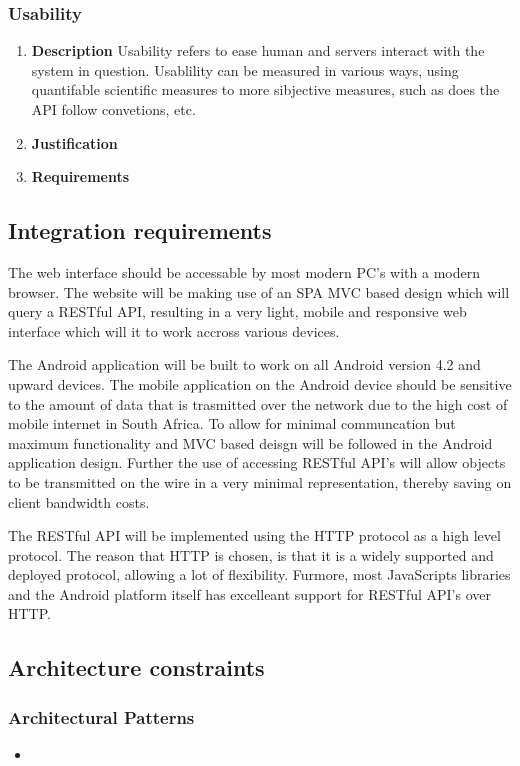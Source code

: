 \documentclass[a4paper,10pt]{article}
\begin{document}
\subsubsection{Usability}
\begin{enumerate}
\item \textbf{Description}
Usability refers to ease human and servers interact with the system in question. Usablility can be measured in various ways, using quantifable scientific measures to more sibjective measures, such as does the API follow convetions, etc.
\item \textbf{Justification}
\item \textbf{Requirements}
\end{enumerate}

\subsection{Integration requirements}
The web interface should be accessable by most modern PC's with a modern browser. The website will be making use of an SPA MVC based design which will query a RESTful API, resulting in a very light, mobile and responsive web interface which will it to work accross various devices.

The Android application will be built to work on all Android version 4.2 and upward devices. The mobile application on the Android device should be sensitive to the amount of data that is trasmitted over the network due to the high cost of mobile internet in South Africa. To allow for minimal communcation but maximum functionality and MVC based deisgn will be followed in the Android application design.  Further the use of accessing RESTful API's will allow objects to be transmitted on the wire in a very minimal representation, thereby saving on client bandwidth costs.

The RESTful API will be implemented using the HTTP protocol as a high level protocol. The reason that HTTP is chosen, is that it is a widely supported and deployed protocol, allowing a lot of flexibility. Furmore, most JavaScripts libraries and the Android platform itself has excelleant support for RESTful API's over HTTP.

\subsection{Architecture constraints}
\subsubsection{Architectural Patterns}
\begin{itemize}
\item
\end{itemize}
\end{document}
